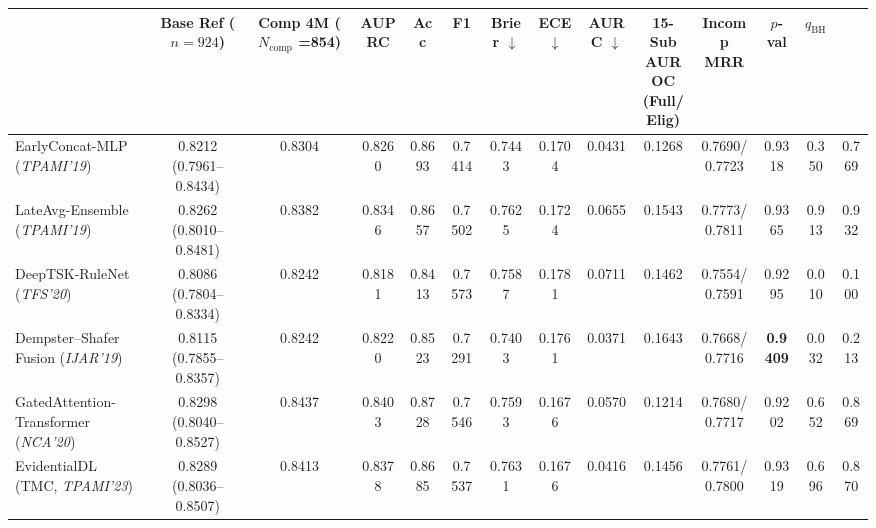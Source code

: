 \documentclass[10pt,twocolumn]{article}
\begin{document}
\begin{table}[t]
{\begin{tabular}{@{}>{\raggedright\arraybackslash}p{4.05cm}ccccccccccccc@{}}
{{CI)}} & \shortstack{\textbf{Base}\\\textbf{Ref}\\\textbf{($n=924$)}} &
\shortstack{\textbf{Comp 4M}\\\textbf{($N_{\text{comp}}$}\\\textbf{=854)}} & \textbf{AUPRC} &
\textbf{Acc} & \textbf{F1} & \textbf{Brier} $\downarrow$ & \textbf{ECE} $\downarrow$ &
\textbf{AURC} $\downarrow$ & \shortstack{\textbf{15-Sub}\\\textbf{AUROC}\\\textbf{(Full/Elig)}}
& \shortstack{\textbf{Incomp}\\\textbf{MRR}} & \textbf{$p$-val} & \textbf{$q_{\text{BH}}$} \\
\midrule
EarlyConcat-MLP (\textit{TPAMI'19}) \cite{baltrusaitis2018multimodal} &
\shortstack{0.8212\\(0.7961--0.8434)} & 0.8304 & 0.8260 & 0.8693 & 0.7414 & 0.7443 & 0.1704 &
0.0431 &
0.1268 & 0.7690/0.7723 & 0.9318 & 0.350 & 0.769 \\
LateAvg-Ensemble (\textit{TPAMI'19}) \cite{baltrusaitis2018multimodal} &
\shortstack{0.8262\\(0.8010--0.8481)} & 0.8382 & 0.8346 & 0.8657 & 0.7502 & 0.7625 & 0.1724 &
0.0655 &
0.1543 & 0.7773/0.7811 & 0.9365 & 0.913 & 0.932 \\
DeepTSK-RuleNet (\textit{TFS'20}) \cite{wu2020optimize} & \shortstack{0.8086\\(0.7804--0.8334)}
& 0.8242 & 0.8181 & 0.8413 & 0.7573 & 0.7587 & 0.1781 & 0.0711 & 0.1462 & 0.7554/0.7591 &
0.9295 & 0.010
& 0.100 \\
Dempster--Shafer Fusion (\textit{IJAR'19}) \cite{denoeux2019decision} &
\shortstack{0.8115\\(0.7855--0.8357)} & 0.8242 & 0.8220 & 0.8523 & 0.7291 & 0.7403 & 0.1761 &
0.0371 & 0.1643 & 0.7668/0.7716 & \textbf{0.9409} & 0.032 & 0.213 \\
GatedAttention-Transformer (\textit{NCA'20}) \cite{vaswani2017attention,arevalo2017gated} &
\shortstack{0.8298\\(0.8040--0.8527)} & 0.8437 & 0.8403 & 0.8728 & 0.7546 & 0.7593 & 0.1676 &
0.0570 &
0.1214 & 0.7680/0.7717 & 0.9202 & 0.652 & 0.869 \\
EvidentialDL (TMC, \textit{TPAMI'23}) \cite{han2022trusted} &
\shortstack{0.8289\\(0.8036--0.8507)} & 0.8413 & 0.8378 & 0.8685 & 0.7537 & 0.7631 & 0.1676 &
0.0416 &
0.1456 & 0.7761/0.7800 & 0.9319 & 0.696 & 0.870 \\

\end{tabular}}
\end{table}
\end{document}
